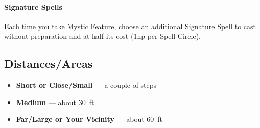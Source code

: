 \documentclass[itdr]{subfiles}
\begin{document}
\vfill
{}
\paragraph{Signature Spells}
Each time you take Mystic Feature, choose an additional Signature Spell to cast without preparation and at half its cost (1hp per Spell Circle).

\vfill
{}

\break

\begin{dbox}
	\subsection*{Distances/Areas}
	\begin{itemize}
		\item \textbf{Short or Close/Small} --- a couple of steps
		\item \textbf{Medium} --- about 30~ft
		\item \textbf{Far/Large or Your Vicinity} --- about 60~ft
	\end{itemize}
\end{dbox}

\vfill
\end{document}
